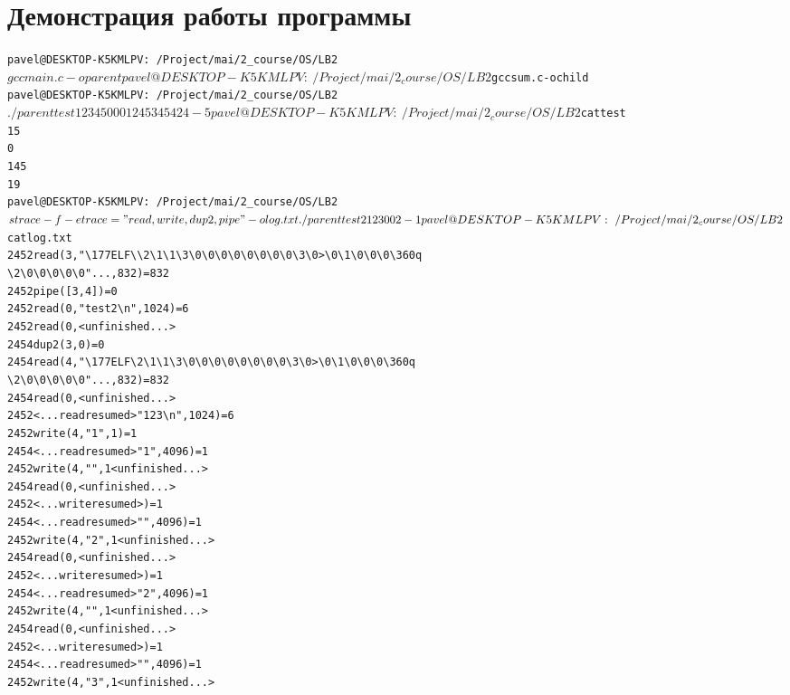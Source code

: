 \documentclass[pdf, unicode, 12pt, a4paper,oneside,fleqn]{article}
\begin{document}
\section{Демонстрация работы программы}

\begin{alltt}
pavel@DESKTOP-K5KMLPV:~/Project/mai/2_course/OS/LB2$ gcc main.c -o parent
pavel@DESKTOP-K5KMLPV:~/Project/mai/2_course/OS/LB2$ gcc sum.c -o child
pavel@DESKTOP-K5KMLPV:~/Project/mai/2_course/OS/LB2$ ./parent
test
1 2 3 4 5
0 0 0
12 45 34 54
24 -5
pavel@DESKTOP-K5KMLPV:~/Project/mai/2_course/OS/LB2$ cat test
15
0
145
19
pavel@DESKTOP-K5KMLPV:~/Project/mai/2_course/OS/LB2$ strace -f -e 
trace="read,write,dup2,pipe" -o log.txt ./parent
test2
1 2 3
0 0
2 -1
pavel@DESKTOP-K5KMLPV:~/Project/mai/2_course/OS/LB2$ cat log.txt
2452  read(3, "\textbackslash177ELF\textbackslash\textbackslash2\textbackslash1\textbackslash1\textbackslash3\textbackslash0\textbackslash0\textbackslash0\textbackslash0\textbackslash0\textbackslash0\textbackslash0\textbackslash0\textbackslash3\textbackslash0>\textbackslash0\textbackslash1\textbackslash0\textbackslash0\textbackslash0\textbackslash360q
\textbackslash2\textbackslash0\textbackslash0\textbackslash0\textbackslash0\textbackslash0"..., 832) = 832
2452  pipe([3, 4])                      = 0
2452  read(0, "test2\textbackslash n", 1024)          = 6
2452  read(0,  <unfinished ...>
2454  dup2(3, 0)                        = 0
2454  read(4, "\textbackslash177ELF\textbackslash2\textbackslash1\textbackslash1\textbackslash3\textbackslash0\textbackslash0\textbackslash0\textbackslash0\textbackslash0\textbackslash0\textbackslash0\textbackslash0\textbackslash3\textbackslash0>\textbackslash0\textbackslash1\textbackslash0\textbackslash0\textbackslash0\textbackslash360q
\textbackslash2\textbackslash0\textbackslash0\textbackslash0\textbackslash0\textbackslash0"..., 832) = 832
2454  read(0,  <unfinished ...>
2452  <... read resumed>"1 2 3\textbackslash{n}", 1024) = 6
2452  write(4, "1", 1)                  = 1
2454  <... read resumed>"1", 4096)      = 1
2452  write(4, " ", 1 <unfinished ...>
2454  read(0,  <unfinished ...>
2452  <... write resumed>)              = 1
2454  <... read resumed>" ", 4096)      = 1
2452  write(4, "2", 1 <unfinished ...>
2454  read(0,  <unfinished ...>
2452  <... write resumed>)              = 1
2454  <... read resumed>"2", 4096)      = 1
2452  write(4, " ", 1 <unfinished ...>
2454  read(0,  <unfinished ...>
2452  <... write resumed>)              = 1
2454  <... read resumed>" ", 4096)      = 1
2452  write(4, "3", 1 <unfinished ...>

\end{alltt}
\end{document}
